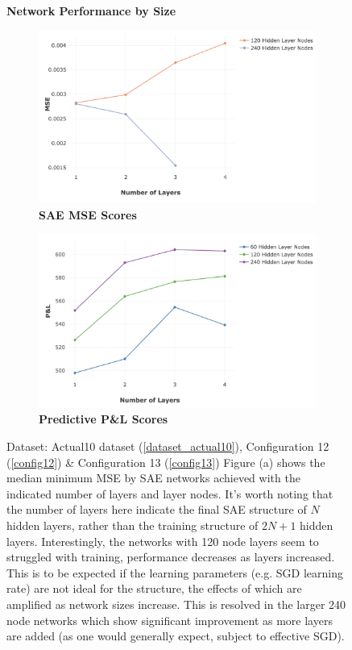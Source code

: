 \documentclass[a4paper,11pt,oneside]{article}
\theoremstyle{plain}
\theoremstyle{definition}
\begin{document}
	\begin{figure}[H]
		\centering
		\textbf{Network Performance by Size}
		\begin{subfigure}{.5\textwidth}
			\centering 
			\includegraphics[scale=0.25]{images/results/network/actual_mse_lines.png}
			\caption{\textbf{SAE MSE Scores} 
				\newline }
			\label{figure-actual_mse_lines}
		\end{subfigure}%
		\begin{subfigure}{.5\textwidth}
			\centering 
			\includegraphics[scale=0.26]{images/results/network/actual_pl_lines.png}
			\caption{\textbf{Predictive P\&L Scores} 
				\newline }
			\label{figure-actual_pl_lines}
		\end{subfigure}
		\caption[Network Performance by Size]{Dataset: Actual10 dataset (\ref{dataset_actual10}), Configuration 12 (\ref{config12}) \& Configuration 13 (\ref{config13})
			\newline Figure (a) shows the median minimum MSE by SAE networks achieved with the indicated number of layers and layer nodes. It's worth noting that the number of layers here indicate the final SAE structure of $N$ hidden layers, rather than the training structure of $2N + 1$ hidden layers. Interestingly, the networks with 120 node layers seem to struggled with training, performance decreases as layers increased. This is to be expected if the learning parameters (e.g. SGD  learning rate) are not ideal for the structure, the effects of which are amplified as network sizes increase. This is resolved in the larger 240 node networks which show significant improvement as more layers are added (as one would generally expect, subject to effective SGD).
}
\end{figure}
\end{document}
